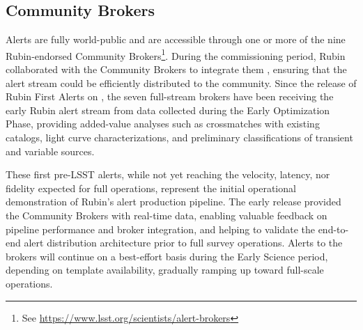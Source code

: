 \subsection{Community Brokers}
\label{ssec:brokers}
Alerts are fully world-public and are accessible through one or more of the nine Rubin-endorsed Community Brokers\footnote{See \url{https://www.lsst.org/scientists/alert-brokers}}.
During the commissioning period, Rubin collaborated with the Community Brokers to integrate them , ensuring that the alert stream could be efficiently distributed to the community.
Since the release of Rubin First Alerts on \rubinfirstalerts, the seven full-stream brokers have been receiving the early Rubin alert stream  from data collected during the Early Optimization Phase, providing added-value analyses such as crossmatches with existing catalogs, light curve characterizations, and preliminary classifications of transient and variable sources.

These first pre-LSST alerts, while not yet reaching the velocity, latency, nor fidelity expected for full operations, represent the initial operational demonstration of Rubin’s alert production pipeline.
The early release provided the Community Brokers with real-time data, enabling valuable feedback on pipeline performance and broker integration, and helping to validate the end-to-end alert distribution architecture prior to full survey operations.
Alerts to the brokers will continue on a best-effort basis during the Early Science period, depending on template availability, gradually ramping up toward full-scale operations.